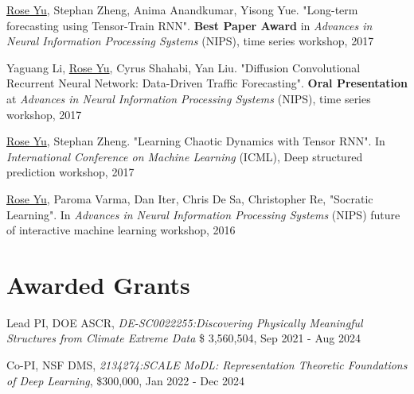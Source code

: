 \documentclass[margin,line]{res}
\begin{document}
\begin{resume}
\begin{enumerate}[label={[W\arabic*]}]
\item \underline{Rose Yu}, Stephan Zheng, Anima Anandkumar, Yisong Yue. "Long-term forecasting using Tensor-Train RNN". \textbf{Best Paper Award}  in \textit{Advances in Neural Information Processing Systems} (NIPS), time series workshop, 2017


\item Yaguang Li, \underline{Rose Yu}, Cyrus Shahabi, Yan Liu. "Diffusion Convolutional Recurrent Neural Network: Data-Driven Traffic Forecasting". \textbf{Oral Presentation} at \textit{Advances in Neural Information Processing Systems} (NIPS), time series workshop, 2017


\item \underline{Rose Yu}, Stephan Zheng. "Learning Chaotic Dynamics with Tensor RNN". In  \textit{International Conference on Machine Learning} (ICML), Deep structured prediction workshop, 2017

\item \underline{Rose Yu},  Paroma Varma, Dan Iter, Chris De Sa, Christopher Re,  "Socratic Learning".  In \textit{Advances in Neural Information Processing Systems}  (NIPS) future of interactive machine learning workshop, 2016

%
%
%
\end{enumerate}


\section{\sc Awarded Grants}
\begin{enumerate}[label={[G\arabic*]}]
\item Lead PI,  DOE ASCR, \textit{DE-SC0022255:Discovering Physically Meaningful Structures from Climate
Extreme Data} \$ 3,560,504, Sep 2021 - Aug 2024
\item Co-PI, NSF DMS, \textit{2134274:SCALE MoDL: Representation Theoretic Foundations of Deep Learning}, \$300,000, Jan 2022 - Dec 2024


\end{enumerate}
\end{resume}
\end{document}
